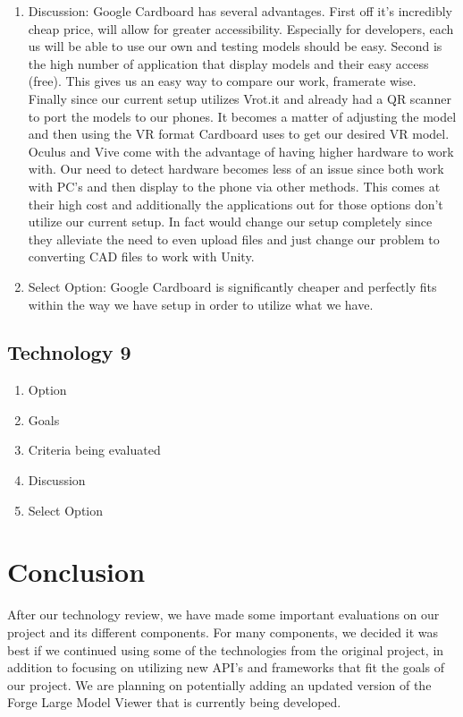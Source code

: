 \documentclass[letterpaper, 10pt, draftclsnofoot, compsoc, onecolumn]{IEEEtran}
\begin{document}
\begin{enumerate}
			\item{Discussion}: Google Cardboard has several advantages. First off it's incredibly cheap price, will allow for greater accessibility. Especially for developers, each us will be able to use our own and testing models should be easy. Second is the high number of application that display models and their easy access (free). This gives us an easy way to compare our work, framerate wise. Finally since our current setup utilizes Vrot.it and already had a QR scanner to port the models to our phones. It becomes a matter of adjusting the model and then using the VR format Cardboard uses to get our desired VR model. Oculus and Vive come with the advantage of having higher hardware to work with. Our need to detect hardware becomes less of an issue since both work with PC's and then display to the phone via other methods. This comes at their high cost and additionally the applications out for those options don't utilize our current setup. In fact would change our setup completely since they alleviate the need to even upload files and just change our problem to converting CAD files to work with Unity. 
			\item{Select Option}: Google Cardboard is significantly cheaper and perfectly fits within the way we have setup in order to utilize what we have. 
		\end{enumerate}
	\subsection{Technology 9}
		\begin{enumerate}
			\item{Option}
			\item{Goals}
			\item{Criteria being evaluated}
			\item{Discussion}
			\item{Select Option}
		\end{enumerate}


\section{Conclusion}
After our technology review, we have made some important evaluations on our project and its different components. For many components, we decided it was best if we continued using some of the technologies from the original project, in addition to focusing on utilizing new API's and frameworks that fit the goals of our project. We are planning on potentially adding an updated version of the Forge Large Model Viewer that is currently being developed.
\end{document}
